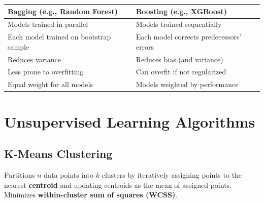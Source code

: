 \documentclass[11pt,a4paper]{article}
\begin{document}
\begin{center}
\begin{tabular}{@{}p{6.5cm}p{6.5cm}@{}}
\toprule
\textbf{Bagging (e.g., Random Forest)} & \textbf{Boosting (e.g., XGBoost)} \\
\midrule
Models trained in parallel & Models trained sequentially \\
Each model trained on bootstrap sample & Each model corrects predecessors' errors \\
Reduces variance & Reduces bias (and variance) \\
Less prone to overfitting & Can overfit if not regularized \\
Equal weight for all models & Models weighted by performance \\
\bottomrule
\end{tabular}
\end{center}

\section{Unsupervised Learning Algorithms}

\subsection{K-Means Clustering}

\begin{definitionbox}[K-Means]
Partitions $n$ data points into $k$ clusters by iteratively assigning points to the nearest \textbf{centroid} and updating centroids as the mean of assigned points. Minimizes \textbf{within-cluster sum of squares (WCSS)}.
\end{definitionbox}
\end{document}
